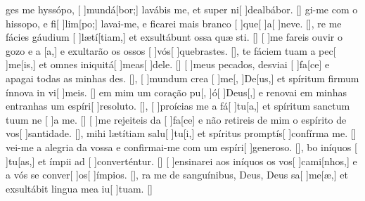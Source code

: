 {  %
  {ges me hyssópo, [ ]{mun}{dá}[bor;] lavábis me, et super ni[ ]{de}{al}{bá}bor. [\LinkLA]}%
    {gi-me com o hissopo, e fi[ ]{lim}[po;] lavai-me, e ficarei mais branco [ ]{que}[ ]{a}[ ]{ne}ve. [\LinkPT]},
  {re me fácies gáudium [ ]{læ}{tí}[tiam,] et exsultábunt ossa quæ sti. [\LinkLA]}%
    {[ ]{me} fareis ouvir o gozo e a [a,] e exultarão os ossos [ ]{vós}[ ]{que}{bras}tes. [\LinkPT]},
  {te fáciem tuam a pec[ ]{me}[is,] et omnes iniquitá[ ]{me}{as}[ ]{de}le. [\LinkLA]}%
    {[ ]{meus} pecados, desviai [ ]{fa}[ce] e apagai todas as minhas des. [\LinkPT]},
  {[ ]{mun}dum crea [ ]{me}[, ]{De}[us,] et spíritum firmum ínnova in vi[ ]{me}is. [\LinkLA]}%
    { em mim um coração pu[, ]{ó}[ ]{Deus}[,] e renovai em minhas entranhas um espíri[ ]{re}{so}{lu}to. [\LinkPT]},
  {[ ]{pro}ícias me a fá[ ]{tu}[a,] et spíritum sanctum tuum ne [ ]{a} me. [\LinkLA]}%
    {[ ]{me} rejeiteis da [ ]{fa}[ce] e não retireis de mim o espírito de vos[ ]{san}{ti}{da}de. [\LinkPT]},
  { mihi lætítiam salu[ ]{tu}[i,] et spíritus promptís[ ]{con}{fírma} me. [\LinkLA]}%
    {vei-me a alegria da vossa  e confir\-mai-me com um espíri[ ]{ge}{ne}{ro}so. [\LinkPT]},
  {bo iníquos [ ]{tu}[as,] et ímpii ad [ ]{con}{ver}{tén}{\-tur.} [\LinkLA]}%
    {[ ]{en}sinarei aos iníquos os vos[ ]{ca}{mi}[nhos,] e a vós se conver[ ]{os}[ ]{ím}pios. [\LinkPT]},
  {ra me de sanguínibus, Deus, Deus sa[ ]{me}[æ,] et exsultábit lingua mea iu[ ]{tu}am. [\LinkLA]}%
}
